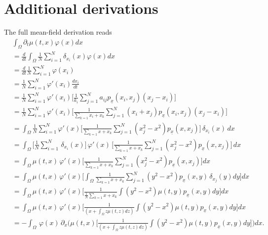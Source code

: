 \documentclass[10pt]{article}
\begin{document}
\section{Additional derivations}\label{appendix: additional}
The full mean-field derivation reads
\begin{align*}
    &\int_\Omega \partial_t\mu(t,x)\varphi(x)dx\\ &= \frac{d}{dt}\int_\Omega\frac{1}{N}\sum_{i=1}^N \delta_{x_i}(x) \varphi(x)dx\\
    &=\frac{d}{dt}\frac{1}{N}\sum_{i=1}^N\varphi(x_i)\\
    &=\frac{1}{N} \sum_{i=1}^N \varphi'(x_i) \frac{dx_i}{dt}\\
    &=\frac{1}{N} \sum_{i=1}^N \varphi'(x_i) \Bigg[\frac{1}{k_i}\sum_{j=1}^N a_{ij}p_{\underline{x}}(x_i,x_j)(x_j-x_i)\Bigg]\\
    &=\frac{1}{N} \sum_{i=1}^N \varphi'(x_i) \Bigg[\frac{1}{\sum_{k=1}x_i+x_k}\sum_{j=1}^N (x_i+x_j)p_{\underline{x}}(x_i,x_j)(x_j-x_i)\Bigg]\\
    &=\int_\Omega\frac{1}{N} \sum_{i=1}^N \varphi'(x) \Bigg[\frac{1}{\sum_{k=1}x+x_k}\sum_{j=1}^N (x_j^2-x^2)p_{\underline{x}}(x,x_j) \Bigg] \,\delta_{x_i}(x) \, dx\\
    &=\int_\Omega \Bigg[ \frac{1}{N} \sum_{i=1}^N \,\delta_{x_i}(x) \Bigg] \, \varphi'(x) \,\Bigg[ \frac{1}{\sum_{k=1}x+x_k}\sum_{j=1}^N (x_j^2-x^2)p_{\underline{x}}(x,x_j) \Bigg] \, dx\\
    &=\int_\Omega\mu(t,x) \,\varphi'(x) \Bigg[\frac{1}{\sum_{k=1}x+x_k}\sum_{j=1}^N (x_j^2-x^2)p_{\underline{x}}(x,x_j)\Bigg] dx\\
    &=\int_\Omega\mu(t,x) \,\varphi'(x) \Bigg[\int_\Omega \frac{1}{\sum_{k=1}x+x_k}\sum_{j=1}^N (y^2-x^2)p_{\underline{x}}(x,y)\,\delta_{x_j}(y)dy\Bigg] dx\\
    &=\int_\Omega\mu(t,x) \,\varphi'(x) \Bigg[ \frac{1}{\frac{1}{N}\sum_{k=1}x+x_k} \int(y^2-x^2)\mu(t,y)p_{\underline{x}}(x,y)dy\Bigg] dx\\
    &=\int_\Omega\mu(t,x) \,\varphi'(x) \Bigg[ \frac{1}{(x+\int_\Omega z\mu(t,z)dz)} \int(y^2-x^2)\mu(t,y)p_{\underline{x}}(x,y)dy\Bigg] dx\\
    &=-\int_\Omega \,\varphi(x) \, \partial_x \Bigg( \mu(t,x)\Bigg[ \frac{1}{(x+\int_\Omega z\mu(t,z)dz)} \int(y^2-x^2)\mu(t,y)p_{\underline{x}}(x,y)dy\Bigg] \Bigg) dx.
\end{align*}
\end{document}
